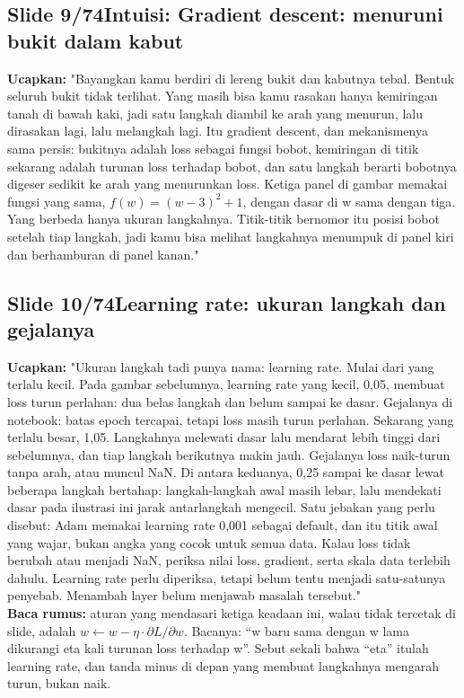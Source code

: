 \documentclass[11pt]{article}
\renewcommand{\framebox}[1]{\colorbox{acc!15}{\textcolor{acc}{\textbf{#1}}}}
\begin{document}
\subsection*{\framebox{Slide 9/74}\quad Intuisi: Gradient descent: menuruni bukit dalam kabut}
\textbf{Ucapkan:} "Bayangkan kamu berdiri di lereng bukit dan kabutnya tebal. Bentuk seluruh bukit tidak terlihat. Yang masih bisa kamu rasakan hanya kemiringan tanah di bawah kaki, jadi satu langkah diambil ke arah yang menurun, lalu dirasakan lagi, lalu melangkah lagi. Itu gradient descent, dan mekanismenya sama persis: bukitnya adalah loss sebagai fungsi bobot, kemiringan di titik sekarang adalah turunan loss terhadap bobot, dan satu langkah berarti bobotnya digeser sedikit ke arah yang menurunkan loss. Ketiga panel di gambar memakai fungsi yang sama, $f(w) = (w-3)^2 + 1$, dengan dasar di w sama dengan tiga. Yang berbeda hanya ukuran langkahnya. Titik-titik bernomor itu posisi bobot setelah tiap langkah, jadi kamu bisa melihat langkahnya menumpuk di panel kiri dan berhamburan di panel kanan."\\[2pt]

\subsection*{\framebox{Slide 10/74}\quad Learning rate: ukuran langkah dan gejalanya}
\textbf{Ucapkan:} "Ukuran langkah tadi punya nama: learning rate. Mulai dari yang terlalu kecil. Pada gambar sebelumnya, learning rate yang kecil, 0,05, membuat loss turun perlahan: dua belas langkah dan belum sampai ke dasar. Gejalanya di notebook: batas epoch tercapai, tetapi loss masih turun perlahan. Sekarang yang terlalu besar, 1,05. Langkahnya melewati dasar lalu mendarat lebih tinggi dari sebelumnya, dan tiap langkah berikutnya makin jauh. Gejalanya loss naik-turun tanpa arah, atau muncul NaN. Di antara keduanya, 0,25 sampai ke dasar lewat beberapa langkah bertahap: langkah-langkah awal masih lebar, lalu mendekati dasar pada ilustrasi ini jarak antarlangkah mengecil. Satu jebakan yang perlu disebut: Adam memakai learning rate 0,001 sebagai default, dan itu titik awal yang wajar, bukan angka yang cocok untuk semua data. Kalau loss tidak berubah atau menjadi NaN, periksa nilai loss, gradient, serta skala data terlebih dahulu. Learning rate perlu diperiksa, tetapi belum tentu menjadi satu-satunya penyebab. Menambah layer belum menjawab masalah tersebut."\\[2pt]
\textbf{Baca rumus:} aturan yang mendasari ketiga keadaan ini, walau tidak tercetak di slide, adalah $w \leftarrow w - \eta \cdot \partial L/\partial w$. Bacanya: ``w baru sama dengan w lama dikurangi eta kali turunan loss terhadap w''. Sebut sekali bahwa ``eta'' itulah learning rate, dan tanda minus di depan yang membuat langkahnya mengarah turun, bukan naik.\\[2pt]
\end{document}
